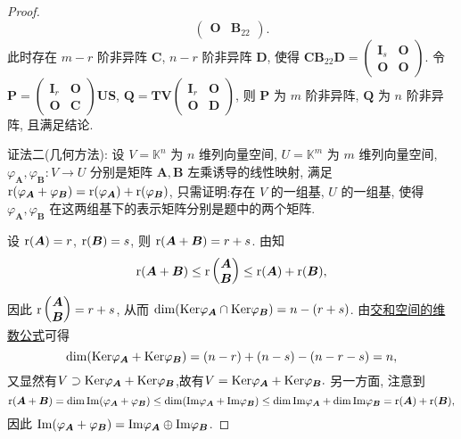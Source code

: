 \documentclass[../../main.tex]{subfiles}
\begin{document}
\begin{proof}
$$\begin{pmatrix}
\boldsymbol{O} & \boldsymbol{B}_{22}
\end{pmatrix}.
$$
此时存在 $m - r$ 阶非异阵 $\boldsymbol{C}$, $n - r$ 阶非异阵 $\boldsymbol{D}$, 使得 $\boldsymbol{C}\boldsymbol{B}_{22}\boldsymbol{D} = \begin{pmatrix}
\boldsymbol{I}_s & \boldsymbol{O} \\
\boldsymbol{O} & \boldsymbol{O}
\end{pmatrix}$. 令 $\boldsymbol{P} = \begin{pmatrix}
\boldsymbol{I}_r & \boldsymbol{O} \\
\boldsymbol{O} & \boldsymbol{C}
\end{pmatrix}\boldsymbol{U}\boldsymbol{S}$, $\boldsymbol{Q} = \boldsymbol{T}\boldsymbol{V}\begin{pmatrix}
\boldsymbol{I}_r & \boldsymbol{O} \\
\boldsymbol{O} & \boldsymbol{D}
\end{pmatrix}$, 则 $\boldsymbol{P}$ 为 $m$ 阶非异阵, $\boldsymbol{Q}$ 为 $n$ 阶非异阵, 且满足结论.

{\color{blue}证法二(几何方法):} 设 $V = \mathbb{K}^n$ 为 $n$ 维列向量空间, $U = \mathbb{K}^m$ 为 $m$ 维列向量空间, $\varphi_{\boldsymbol{A}}, \varphi_{\boldsymbol{B}}: V \to U$ 分别是矩阵 $\boldsymbol{A}, \boldsymbol{B}$ 左乘诱导的线性映射, 满足 ${\rm r}(\varphi_{\boldsymbol{A}} + \varphi_{\boldsymbol{B}}) = {\rm r}(\varphi_{\boldsymbol{A}}) + {\rm r}(\varphi_{\boldsymbol{B}})$, 只需证明:存在 $V$ 的一组基, $U$ 的一组基, 使得 $\varphi_{\boldsymbol{A}}, \varphi_{\boldsymbol{B}}$ 在这两组基下的表示矩阵分别是题中的两个矩阵. 

设 ${\rm r}(\boldsymbol{A}) = r$, ${\rm r}(\boldsymbol{B}) = s$, 则 ${\rm r}(\boldsymbol{A} + \boldsymbol{B}) = r + s$. 由知
$$
{\rm r}(\boldsymbol{A} + \boldsymbol{B}) \leq {\rm r}\begin{pmatrix}
\boldsymbol{A} \\
\boldsymbol{B}
\end{pmatrix} \leq {\rm r}(\boldsymbol{A}) + {\rm r}(\boldsymbol{B}),$$
因此 ${\rm r}\begin{pmatrix}
\boldsymbol{A} \\
\boldsymbol{B}
\end{pmatrix} = r + s$, 从而 $\dim({\rm Ker}\varphi_{\boldsymbol{A}} \cap {\rm Ker}\varphi_{\boldsymbol{B}}) = n - (r + s)$. 由\hyperref[theorem:交和空间维数公式]{交和空间的维数公式}可得 
$$\dim({\rm Ker}\varphi_{\boldsymbol{A}} + {\rm Ker}\varphi_{\boldsymbol{B}}) = (n - r) + (n - s) - (n - r - s) = n,$$
又显然有$V\supset  {\rm Ker}\varphi_{\boldsymbol{A}} + {\rm Ker}\varphi_{\boldsymbol{B}}$,故有$V = {\rm Ker}\varphi_{\boldsymbol{A}} + {\rm Ker}\varphi_{\boldsymbol{B}}.$
另一方面, 注意到 
$${\rm r}(\boldsymbol{A} + \boldsymbol{B}) = \dim{\rm Im}(\varphi_{\boldsymbol{A}} + \varphi_{\boldsymbol{B}}) \leq \dim({\rm Im}\varphi_{\boldsymbol{A}} + {\rm Im}\varphi_{\boldsymbol{B}}) \leq \dim{\rm Im}\varphi_{\boldsymbol{A}} + \dim{\rm Im}\varphi_{\boldsymbol{B}} = {\rm r}(\boldsymbol{A}) + {\rm r}(\boldsymbol{B}),$$
因此 ${\rm Im}(\varphi_{\boldsymbol{A}} + \varphi_{\boldsymbol{B}}) = {\rm Im}\varphi_{\boldsymbol{A}} \oplus {\rm Im}\varphi_{\boldsymbol{B}}$. 


\end{proof}
\end{document}
